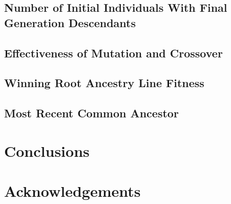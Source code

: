 \documentclass[12pt]{article}
\begin{document}
\subsection{Number of Initial Individuals With Final Generation Descendants} \label{Number Initial Individuals 
With Descendants}

\subsection{Effectiveness of Mutation and Crossover} \label{Effectiveness Mutation Crossover}

\subsection{Winning Root Ancestry Line Fitness} \label{Winning Root Line Fitness}

\subsection{Most Recent Common Ancestor} \label{Most Recent Common Ancestor}

\section{Conclusions} \label{Conclusions}

\section*{Acknowledgements}

\pagebreak



\end{document}
